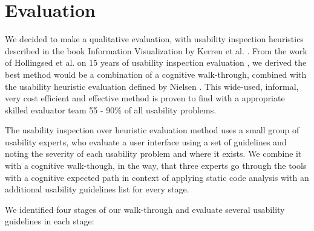 \documentclass[conference]{IEEEtran}
\begin{document}
\section{Evaluation}
\label{sec:evaluation}
We decided to make a qualitative evaluation, with usability inspection heuristics described in the book Information Visualization by Kerren et al. \cite{InformationVisualizationBook}.
From the work of Hollingsed et al. on 15 years of usability inspection evaluation \cite{15yearsUsabilityEvaluation}, we derived the best method would be a combination of a cognitive walk-through, combined with the usability heuristic evaluation defined by Nielsen \cite{Nielsen:UsabilityInspectionMethods}.
This wide-used, informal, very cost efficient and effective method is proven to find with a appropriate skilled evaluator team 55 - 90\% of all usability problems.


The usability inspection over heuristic evaluation method uses a small group of usability experts, who evaluate a
user interface using a set of guidelines and noting the severity of
each usability problem and where it exists. 
We combine it with a cognitive walk-though, in the way, that three experts go through the tools with a cognitive expected path in context of applying static code analysis with an additional usability guidelines list for every stage.


We identified four stages of our walk-through and evaluate several usability guidelines in each stage:
\end{document}

